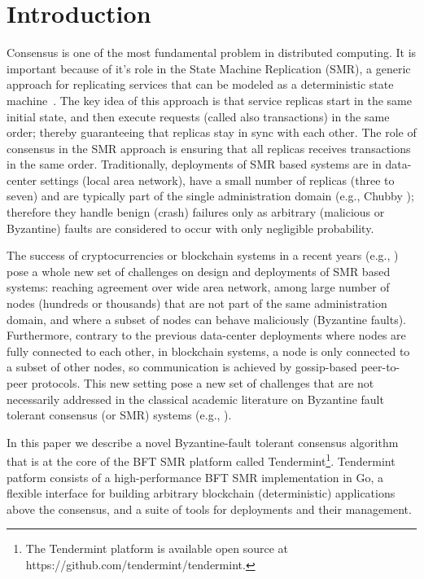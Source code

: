 \section{Introduction}
\label{sec:tendermint}

Consensus is one of the most fundamental problem in distributed computing. It is important because of it's role in the State Machine Replication (SMR), a generic approach for replicating services that can be modeled as a deterministic state machine~\cite{Lam78:cacm, Sch90:survey}. The key idea of this approach is that service replicas start in the same initial state, and then execute requests (called also transactions) in the same order; thereby guaranteeing that replicas stay in sync with each other. The role of consensus in the SMR approach is ensuring that all replicas receives transactions in the same order. 
Traditionally, deployments of SMR based systems are in data-center settings (local area network), have a small number of replicas (three to seven) and are typically part of the single administration domain (e.g., Chubby \cite{Bur:osdi06}); therefore they handle benign (crash) failures only as arbitrary (malicious or Byzantine) faults are considered to occur with only negligible probability.  

The success of cryptocurrencies or blockchain systems in a recent years (e.g., \cite{Nak2012:bitcoin, But2014:ethereum}) pose a whole new set of challenges on design and deployments of SMR based systems: reaching agreement over wide area network, among large number of nodes (hundreds or thousands) that are not part of the same administration domain, and where a subset of nodes can behave maliciously (Byzantine faults). Furthermore, contrary to the previous data-center deployments where nodes are fully connected to each other, in blockchain systems, a node is only connected to a subset of other nodes, so communication is achieved by gossip-based peer-to-peer protocols. This new setting pose a new set of challenges that are not necessarily addressed in the classical academic literature on Byzantine fault tolerant consensus (or SMR) systems (e.g., \cite{DLS88:jacm, CL02:tcs}).

In this paper we describe a novel Byzantine-fault tolerant consensus algorithm that is at the core of the BFT SMR platform called Tendermint\footnote{The Tendermint platform is available open source at https://github.com/tendermint/tendermint.}. Tendermint patform consists
of a high-performance BFT SMR implementation in Go, a flexible interface for building arbitrary blockchain (deterministic) applications above the consensus, and a suite of tools for deployments and their management.  

